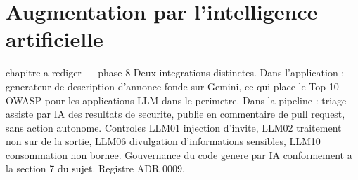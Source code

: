 ﻿%
\chapter{Augmentation par l'intelligence artificielle}
\label{chap:ia}

\begin{constat}{chapitre a rediger --- phase 8}
Deux integrations distinctes. Dans l'application : generateur de description d'annonce fonde sur Gemini, ce qui place le Top 10 OWASP pour les applications LLM dans le perimetre. Dans la pipeline : triage assiste par IA des resultats de securite, publie en commentaire de pull request, sans action autonome. Controles LLM01 injection d'invite, LLM02 traitement non sur de la sortie, LLM06 divulgation d'informations sensibles, LLM10 consommation non bornee. Gouvernance du code genere par IA conformement a la section 7 du sujet. Registre ADR 0009.
\end{constat}

